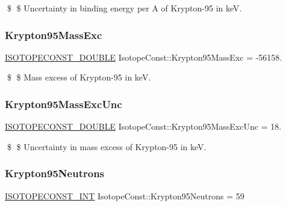 \$ \$ Uncertainty in binding energy per A of Krypton-\/95 in keV. \mbox{\label{group___isotope_const-_krypton-_kr95_ga0709f1a1da68bf9edd46c00e0eb1c436}} 
\subsubsection{\texorpdfstring{Krypton95\+Mass\+Exc}{Krypton95MassExc}}
{\footnotesize\ttfamily \mbox{\hyperlink{group___isotope_const-_macros_ga8f45a7272ce02c0b4c65c44636ed719a}{I\+S\+O\+T\+O\+P\+E\+C\+O\+N\+S\+T\+\_\+\+D\+O\+U\+B\+LE}} Isotope\+Const\+::\+Krypton95\+Mass\+Exc = -\/56158.}

\$ \$ Mass excess of Krypton-\/95 in keV. \mbox{\label{group___isotope_const-_krypton-_kr95_gaaa625d951d827fc7cccc4445e2f81187}} 
\subsubsection{\texorpdfstring{Krypton95\+Mass\+Exc\+Unc}{Krypton95MassExcUnc}}
{\footnotesize\ttfamily \mbox{\hyperlink{group___isotope_const-_macros_ga8f45a7272ce02c0b4c65c44636ed719a}{I\+S\+O\+T\+O\+P\+E\+C\+O\+N\+S\+T\+\_\+\+D\+O\+U\+B\+LE}} Isotope\+Const\+::\+Krypton95\+Mass\+Exc\+Unc = 18.}

\$ \$ Uncertainty in mass excess of Krypton-\/95 in keV. \mbox{\label{group___isotope_const-_krypton-_kr95_ga7bc9d51d6dbfda0298f3eca89c0c50d6}} 
\subsubsection{\texorpdfstring{Krypton95\+Neutrons}{Krypton95Neutrons}}
{\footnotesize\ttfamily \mbox{\hyperlink{group___isotope_const-_macros_ga5f18360b3e99483a35c32d789e62621c}{I\+S\+O\+T\+O\+P\+E\+C\+O\+N\+S\+T\+\_\+\+I\+NT}} Isotope\+Const\+::\+Krypton95\+Neutrons = 59}


